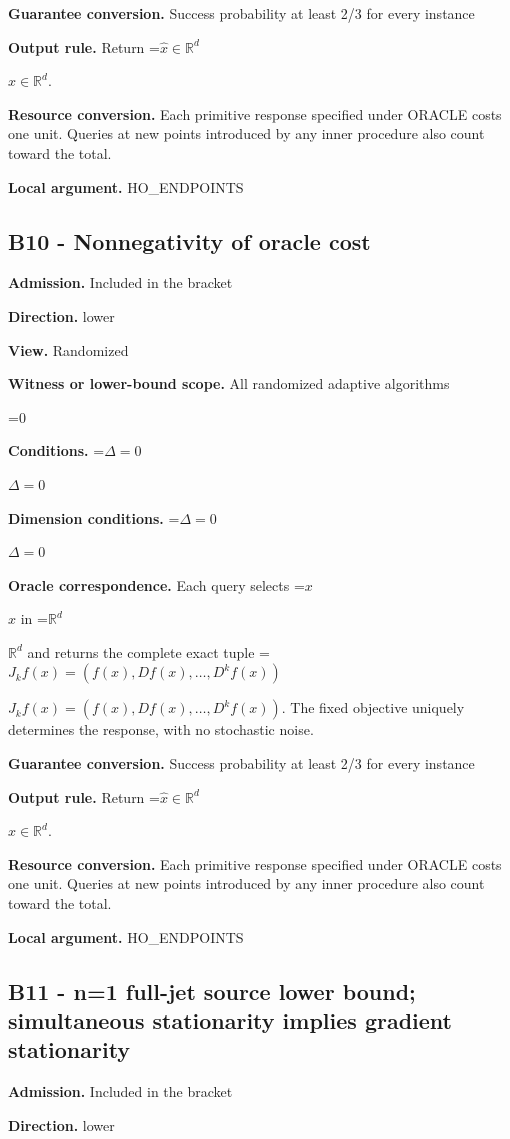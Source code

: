 \documentclass[10pt,a4paper]{article}
\newcommand{\AtlasMath}[1]{\par\begingroup\centering\setbox0=\hbox{$\displaystyle #1$}\ifdim\wd0>1.4\linewidth\typeout{ATLAS WIDE FORMULA: \the\wd0}\fi\ifdim\wd0>\linewidth\resizebox{\linewidth}{!}{\box0}\else\box0\fi\par\endgroup}
\newcommand{\AtlasInlineMath}[1]{\begingroup\setbox0=\hbox{$#1$}\ifdim\wd0>.4\linewidth\endgroup\AtlasMath{#1}\else\endgroup$#1$\fi}
\begin{document}
\textbf{Guarantee conversion.} Success probability at least 2/3 for every instance

\textbf{Output rule.} Return \AtlasInlineMath{\widehat{x}\in \mathbb{R}^d}.

\textbf{Resource conversion.} Each primitive response specified under ORACLE costs one unit. Queries at new points introduced by any inner procedure also count toward the total.

\textbf{Local argument.} HO\_\allowbreak{}ENDPOINTS

\subsection{B10 - Nonnegativity of oracle cost}
\textbf{Admission.} Included in the bracket

\textbf{Direction.} lower

\textbf{View.} Randomized

\textbf{Witness or lower-bound scope.} All randomized adaptive algorithms

\AtlasMath{0}
\textbf{Conditions.} \AtlasInlineMath{\Delta=0}

\textbf{Dimension conditions.} \AtlasInlineMath{\Delta=0}

\textbf{Oracle correspondence.} Each query selects \AtlasInlineMath{x} in \AtlasInlineMath{\mathbb{R}^d} and returns the complete exact tuple \AtlasInlineMath{J_{k}f(x)=(f(x),Df(x),\ldots,D^{k}f(x))}. The fixed objective uniquely determines the response, with no stochastic noise.

\textbf{Guarantee conversion.} Success probability at least 2/3 for every instance

\textbf{Output rule.} Return \AtlasInlineMath{\widehat{x}\in \mathbb{R}^d}.

\textbf{Resource conversion.} Each primitive response specified under ORACLE costs one unit. Queries at new points introduced by any inner procedure also count toward the total.

\textbf{Local argument.} HO\_\allowbreak{}ENDPOINTS

\subsection{B11 - n=1 full-jet source lower bound; simultaneous stationarity implies gradient stationarity}
\textbf{Admission.} Included in the bracket

\textbf{Direction.} lower
\end{document}
